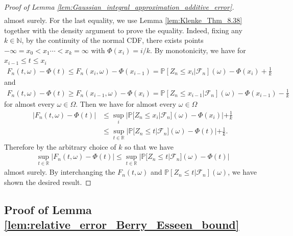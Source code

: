 \documentclass[12pt]{article}
\theoremstyle{definition}
\def\P{\mathbb{P}}
\def\P{\mathbb{P}}
\renewcommand{\P}{\mathbb{P}}							%
\begin{document}
\begin{proof}[Proof of Lemma \ref{lem:Gaussian_integral_approximation_additive_error}]
\begin{align*}
	\end{align*}
	almost surely. For the last equality, we use Lemma \ref{lem:Klenke_Thm_8.38} together with the density argument to prove the equality. Indeed, fixing any $k\in \mathbb{N}$, by the continuity of the normal CDF, there exists points $-\infty=x_0<x_1\cdots<x_k=\infty$ with $\Phi(x_i)=i/k$. By monotonicity, we have for $x_{i-1}\leq t\leq x_i$
	\begin{align*}
		F_n(t,\omega)-\Phi(t)\leq F_n(x_i,\omega)-\Phi(x_{i-1})=\P[Z_n\leq x_i|\mathcal{F}_n](\omega)-\Phi(x_i)+\frac{1}{k}
	\end{align*}
	and 
	\begin{align*}
		F_n(t,\omega)-\Phi(t)\geq F_n(x_{i-1},\omega)-\Phi(x_i)=\P[Z_n\leq x_{i-1}|\mathcal{F}_n](\omega)-\Phi(x_{i-1})-\frac{1}{k}
	\end{align*}
	for almost every $\omega\in\Omega$. Then we have for almost every $\omega\in\Omega$
	\begin{align*}
		|F_n(t,\omega)-\Phi(t)|
		&
		\leq \sup_{i}|\P[Z_n\leq x_{i}|\mathcal{F}_n](\omega)-\Phi(x_{i})|+\frac{1}{k}\\
		&
		\leq \sup_{t\in \mathbb{R}}|\P[Z_n\leq t|\mathcal{F}_n](\omega)-\Phi(t)|+\frac{1}{k}.
	\end{align*}
	Therefore by the arbitrary choice of $k$ so that we have 
	\begin{align*}
		\sup_{t\in\mathbb{R}}|F_n(t,\omega)-\Phi(t)|\leq \sup_{t\in \mathbb{R}}|\P[Z_n\leq t|\mathcal{F}_n](\omega)-\Phi(t)|
	\end{align*}
	almost surely. By interchanging the $F_n(t,\omega)$ and $\P[Z_n\leq t|\mathcal{F}_n](\omega)$, we have shown the desired result.
\end{proof}


\subsection{Proof of Lemma \ref{lem:relative_error_Berry_Esseen_bound}}
\end{document}

